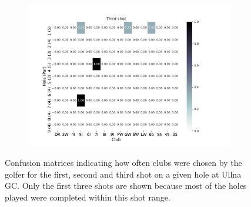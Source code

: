 \documentclass{kththesis}
\begin{document}
\begin{figure}
\begin{subfigure}{\textwidth}
    \centering
    \includegraphics[height=0.3\textheight]{L2ClubChoices/Ludvig_Ullna_Club_Choices_Third_Shot.png} 
    \end{subfigure}
    \caption{Confusion matrices indicating how often clubs were chosen by the golfer for the first, second and third shot on a given hole at Ullna GC. Only the first three shots are shown because most of the holes played were completed within this shot range.}
    \label{fig:L2_ullna_club_choice_confusion}
\end{figure}
\end{document}
